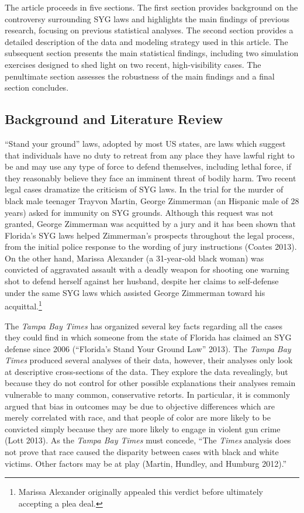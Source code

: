 \documentclass[12pt,article]{article}
\begin{document}
The article proceeds in five sections. The first section provides
background on the controversy surrounding SYG laws and highlights the
main findings of previous research, focusing on previous statistical
analyses. The second section provides a detailed description of the data
and modeling strategy used in this article. The subsequent section
presents the main statistical findings, including two simulation
exercises designed to shed light on two recent, high-visibility cases.
The penultimate section assesses the robustness of the main findings and
a final section concludes.

\subsection{Background and Literature
Review}\label{background-and-literature-review}

``Stand your ground'' laws, adopted by most US states, are laws which
suggest that individuals have no duty to retreat from any place they
have lawful right to be and may use any type of force to defend
themselves, including lethal force, if they reasonably believe they face
an imminent threat of bodily harm. Two recent legal cases dramatize the
criticism of SYG laws. In the trial for the murder of black male
teenager Trayvon Martin, George Zimmerman (an Hispanic male of 28 years)
asked for immunity on SYG grounds. Although this request was not
granted, George Zimmerman was acquitted by a jury and it has been shown
that Florida's SYG laws helped Zimmerman's prospects throughout the
legal process, from the initial police response to the wording of jury
instructions (Coates 2013). On the other hand, Marissa Alexander (a
31-year-old black woman) was convicted of aggravated assault with a
deadly weapon for shooting one warning shot to defend herself against
her husband, despite her claims to self-defense under the same SYG laws
which assisted George Zimmerman toward his acquittal.\footnote{Marissa
  Alexander originally appealed this verdict before ultimately accepting
  a plea deal.}

The \emph{Tampa Bay Times} has organized several key facts regarding all
the cases they could find in which someone from the state of Florida has
claimed an SYG defense since 2006 (``Florida's Stand Your Ground Law''
2013). The \emph{Tampa Bay Times} produced several analyses of their
data, however, their analyses only look at descriptive cross-sections of
the data. They explore the data revealingly, but because they do not
control for other possible explanations their analyses remain vulnerable
to many common, conservative retorts. In particular, it is commonly
argued that bias in outcomes may be due to objective differences which
are merely correlated with race, and that people of color are more
likely to be convicted simply because they are more likely to engage in
violent gun crime (Lott 2013). As the \emph{Tampa Bay Times} must
concede, ``The \emph{Times} analysis does not prove that race caused the
disparity between cases with black and white victims. Other factors may
be at play (Martin, Hundley, and Humburg 2012).''
\end{document}
